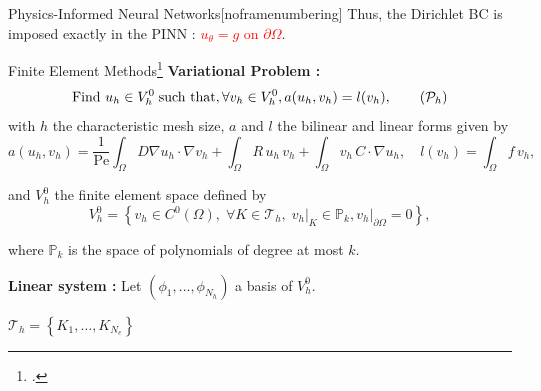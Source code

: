 \begin{subappendixframe}{Physics-Informed Neural Networks}[noframenumbering]
	\vspace{5pt}
	Thus, the Dirichlet BC is imposed exactly in the PINN : \textcolor{red}{$u_{\theta} = g$ on $\partial \Omega$}.

	\vspace{15pt}
\end{subappendixframe}

\addtocounter{subappendixframenumber}{1}
\begin{subappendixframe}{Finite Element Methods\footcite{Ern2004TheoryAP}}	
	\textbf{Variational Problem :} 
	\begin{equation}
		\label{eq:weakform}
		\text{Find } u_h\in V_h^0 \;\text{such that}, \forall v_h\in V_h^0, a(u_h,v_h)=l(v_h),
		\tag{$\mathcal{P}_h$}
	\end{equation}
	\vspace{1pt}
	with $h$ the characteristic mesh size, $a$ and $l$ the bilinear and linear forms given by
	\vspace{-3pt}
	\begin{equation*}
		a(u_h,v_h)=
		\frac{1}{\text{Pe}} \int_{\Omega}D \nabla u_h \cdot  \nabla v_h+
		\int_{\Omega} R \, u_h \, v_h  +
		\int_{\Omega} v_h \, C \cdot \nabla u_h, \quad l(v_h)=\int_{\Omega} f \, v_h,
	\end{equation*}

	\begin{minipage}[t]{0.7\linewidth}
		\vspace{-3pt}
		and $V_h^0$ the finite element space defined by
		\vspace{-3pt}
		\begin{equation*}
			V_h^0 = \left\{v_h\in C^0(\Omega),\; \forall K\in \mathcal{T}_h,\; v_h\vert_{K}\in\mathbb{P}_k,v_h\vert_{\partial\Omega}=0\right\},
		\end{equation*}
		
		\vspace{-3pt}
		where $\mathbb{P}_k$ is the space of polynomials of degree at most $k$.
		
		\vspace{10pt}
		\textbf{Linear system :} Let $(\phi_1,\dots,\phi_{N_h})$ a basis of $V_h^0$.
	\end{minipage} \qquad \begin{minipage}[t][][b]{0.2\linewidth}
		\centering
		
		\footnotesize
		$\mathcal{T}_h = \left\{K_1,\dots,K_{N_e}\right\}$
		

\end{minipage}
\end{subappendixframe}

